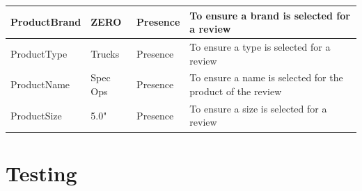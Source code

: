 \begin{center}
\begin{tabular}{|p{3cm}|p{3cm}|p{3cm}|p{3cm}|} \hline
ProductBrand & ZERO & Presence & To ensure a brand is selected for a review \\ \hline
ProductType & Trucks & Presence & To ensure a type is selected for a review \\ \hline
ProductName & Spec Ops & Presence & To ensure a name is selected for the product of the review \\ \hline
ProductSize & 5.0" & Presence & To ensure a size is selected for a review \\ \hline 
\end{tabular}
\end{center} 
\section{Testing}

